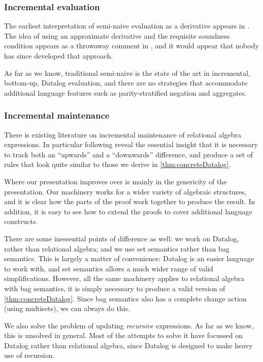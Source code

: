 \subsubsection{Incremental evaluation}

The earliest interpretation of semi-naive evaluation as a derivative 
appears in \textcite{bancilhon1986naive}. The idea of using an approximate derivative
and the requisite soundness condition appears as a throwaway comment in
\textcite[][section 3.2.2]{bancilhon1986amateur}, and it would appear that nobody has since
developed that approach.

As far as we know, traditional semi-naive is the state of
the art in incremental, bottom-up, Datalog evaluation, and there are no strategies that
accommodate additional language features such as parity-stratified negation and aggregates.

\subsubsection{Incremental maintenance}

There is existing literature on incremental maintenance of relational algebra
expressions. In particular \textcite{griffin1997improved} following
\textcite{qian1991incremental} reveal the essential insight that it is necessary to
track both an ``upwards'' and a ``downwards'' difference, and produce a set of
rules that look quite similar to those we derive in \cref{thm:concreteDatalog}.

Where our presentation improves over \citeauthor{griffin1997improved} is mainly in
the genericity of the presentation. Our machinery works for a wider variety of
algebraic structures, and it is clear how the parts of the proof work together
to produce the result. In addition, it is easy to see how to extend the proofs
to cover additional language constructs.

There are some inessential points of difference as well: we work on Datalog,
rather than relational algebra; and we use set semantics rather than bag
semantics. This is largely a matter of convenience: Datalog is an easier
language to work with, and set semantics allows a much wider range of valid
simplifications. However, all the same machinery applies to relational algebra
with bag semantics, it is simply necessary to produce a valid version of
\cref{thm:concreteDatalog}. Since bag semantics also has a complete change
action (using multisets), we can always do this.

We also solve the problem of updating \emph{recursive} expressions. As far as we
know, this is unsolved in general. Most of the attempts to solve it have
focussed on Datalog rather than relational algebra, since Datalog is designed to
make heavy use of recursion.

